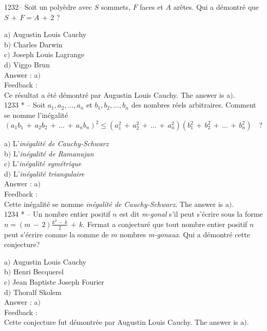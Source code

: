 \documentclass[letterpaper, 12pt]{article}
\begin{document}
1232-- Soit un poly\`edre avec $S$ sommets, $F$ faces et $A$
ar\^etes. Qui a d\'emontr\'e que $S\,+\,F=A\,+\,2$ ?

a$)$ Augustin Louis Cauchy \\
b$)$ Charles Darwin \\
c$)$ Joseph Louis Lagrange \\
d$)$ Viggo Brun\\

Answer : a$)$\\

Feedback : \\
Ce r\'esultat a \'et\'e d\'emontr\'e par Augustin Louis Cauchy.
The answer is a$)$.\\

1233 * -- Soit $a_1,a_2,\ldots,a_n$ et $b_1,b_2,\ldots,b_n$ des nombres
r\'eels arbitraires. Comment se nomme l'in\'egalit\'e
$$(a_1b_1\,+\,a_2b_2\,+\,\ldots\,+\,a_nb_n)^2\le(a_1^2\,+\,a_2^2\,+\,\ldots\,+\,a_n^2)(b_1^2\,+\,b_2^2\,+\,\ldots\,+\,b_n^2)\quad?$$

a$)$ L'{\sl in\'egalit\'e de Cauchy-Schwarz} \\
b$)$ L'{\sl in\'egalit\'e de Ramanujan} \\
c$)$ L'{\sl in\'egalit\'e sym\'etrique} \\
d$)$ L'{\sl in\'egalit\'e triangulaire}\\

Answer : a$)$\\

Feedback : \\
Cette in\'egalit\'e se nomme {\sl in\'egalit\'e de Cauchy-Schwarz}.
The answer is a$)$.\\

1234 * -- Un nombre entier positif $n$ est dit {\sl m-gonal} s'il
peut s'\'ecrire sous la forme
$\displaystyle{n=(m\,-\,2)\frac{k^2\,-\,k}2\,+\,k}$. Fermat a
conjectur\'e que tout nombre entier positif $n$ peut s'\'ecrire
comme la somme de $m$ nombres {\sl m-gonaux}. Qui a d\'emontr\'e
cette conjecture?

a$)$ Augustin Louis Cauchy \\
b$)$ Henri Becquerel \\
c$)$ Jean Baptiste Joseph Fourier \\
d$)$ Thoralf Skolem\\

Answer : a$)$\\

Feedback : \\
Cette conjecture fut d\'emontr\'ee par Augustin Louis Cauchy.
The answer is a$)$.\\
\end{document}
